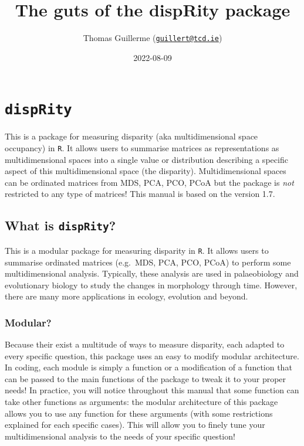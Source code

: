 \documentclass[
]{book}
\title{The guts of the dispRity package}
\author{Thomas Guillerme (\href{mailto:guillert@tcd.ie}{\nolinkurl{guillert@tcd.ie}})}
\date{2022-08-09}
\begin{document}
\maketitle

{
\setcounter{tocdepth}{1}
\tableofcontents
}
\hypertarget{disprity}{%
\chapter{\texorpdfstring{\texttt{dispRity}}{dispRity}}\label{disprity}}

This is a package for measuring disparity (aka multidimensional space occupancy) in \texttt{R}.
It allows users to summarise matrices as representations as multidimensional spaces into a single value or distribution describing a specific aspect of this multidimensional space (the disparity).
Multidimensional spaces can be ordinated matrices from MDS, PCA, PCO, PCoA but the package is \emph{not} restricted to any type of matrices!
This manual is based on the version 1.7.

\hypertarget{what-is-disprity}{%
\section{\texorpdfstring{What is \texttt{dispRity}?}{What is dispRity?}}\label{what-is-disprity}}

This is a modular package for measuring disparity in \texttt{R}.
It allows users to summarise ordinated matrices (e.g.~MDS, PCA, PCO, PCoA) to perform some multidimensional analysis.
Typically, these analysis are used in palaeobiology and evolutionary biology to study the changes in morphology through time.
However, there are many more applications in ecology, evolution and beyond.

\hypertarget{modular}{%
\subsection{Modular?}\label{modular}}

Because their exist a multitude of ways to measure disparity, each adapted to every specific question, this package uses an easy to modify modular architecture.
In coding, each module is simply a function or a modification of a function that can be passed to the main functions of the package to tweak it to your proper needs!
In practice, you will notice throughout this manual that some function can take other functions as arguments: the modular architecture of this package allows you to use any function for these arguments (with some restrictions explained for each specific cases).
This will allow you to finely tune your multidimensional analysis to the needs of your specific question!
\end{document}
